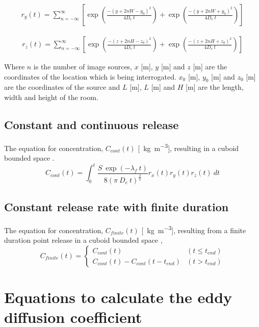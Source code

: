 \documentclass[]{article}
\begin{document}
\begin{eqnarray}
	r_{y}(t) = \sum^{\infty}_{n = -\infty} \left[\exp\left(\frac{-(y + 2nW-
	y_{0})^{2}}{4D_e\:t}\right) + \exp\left(\frac{-(y + 2nW +
	y_{0})^{2}}{4D_e\:t}\right)\right]
\end{eqnarray}

\begin{eqnarray}
	r_{z}(t) = \sum^{\infty}_{n = -\infty} \left[\exp\left(\frac{-(z + 2nH -
	z_{0})^{2}}{4D_e\:t}\right) + \exp\left(\frac{-(z + 2nH +
	z_{0})^{2}}{4D_e\:t}\right)\right]
\end{eqnarray}

Where $n$ is the number of image sources, $x$ [m], $y$ [m] and $z$ [m] are the
coordinates of the location which is being interrogated. $x_0$ [m], $y_0$ [m]
and $z_0$ [m] are the coordinates of the source and $L$ [m], $L$ [m] and $H$ [m]
are the length, width and height of the room. 

\subsection{Constant and continuous release}\label{sec:EddyCont}

The equation for concentration, $C_{cont}(t)$
[\SI{}{\kilo\gram\per\meter\cubed}], resulting in a cuboid bounded space
\cite{cheng11}. 
\begin{equation}\label{eq:modelCont}
	C_{cont}(t) = \int^{t}_0  \frac{S\: \exp(-\lambda_f\:t)}{8(\pi\:D_e\:t)^{\frac{3}{2}}} r_{x}(t) r_{y}(t) r_{z}(t)\:dt
\end{equation}

\subsection{Constant release rate with finite duration}\label{sec:EddyFinite}

The equation for concentration, $C_{finite}(t)$
[\SI{}{\kilo\gram\per\meter\cubed}], resulting from a finite duration point
release in a cuboid bounded space \cite{foat20},
\begin{equation}\label{eq:modelFiniteDuration}
	C_{finite}(t) = 
	\begin{cases} 
		C_{cont}(t)															& (t \leq t_{end}) \\
		C_{cont}(t) - C_{cont}(t - t_{end})			& (t > t_{end})
	\end{cases} 
\end{equation}

\section{Equations to calculate the eddy diffusion coefficient}\label{app:tkeb}
\end{document}
